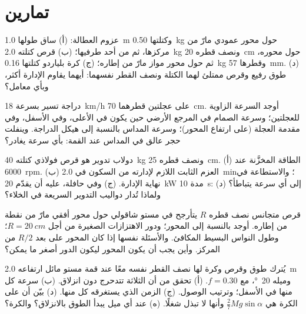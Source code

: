 \section{تمارين}

\begin{exercise}[$\star$]\label{exo:b2:rigid-body-mechanics:1}
عزوم العطالة: (أ) ساق طولها \qty{1.0}{m} وكتلتها \qty{0.50}{kg} حول
محور عمودي مارّ من مركزها، ثم من أحد طرفيها؛ (ب) قرص كتلته
\qty{2.0}{kg} ونصف قطره \qty{20}{cm} حول محوره، ثم حول محور مواز
مارّ من إطاره؛ (ج) كرة بلياردو كتلتها \qty{0.16}{kg} وقطرها
\qty{57}{mm}. (د) طوق رفيع وقرص ممتلئ لهما الكتلة ونصف القطر
نفسهما: أيهما يقاوم الإدارة أكثر، وبأي معامل؟
\end{exercise}

\begin{exercise}[$\star$]\label{exo:b2:rigid-body-mechanics:2}
دراجة تسير بسرعة \qty{18}{km/h} على عجلتين قطرهما \qty{70}{cm}.
أوجد السرعة الزاوية للعجلتين؛ وسرعة الصمام في المرجع الأرضي
حين يكون في الأعلى، وفي الأسفل، وفي مقدمة العجلة (على ارتفاع
المحور)؛ وسرعة المداس بالنسبة إلى هيكل الدراجة. وينفلت حجر عالق
في المداس عند القمة: بأي سرعة يغادر؟
\end{exercise}

\begin{exercise}[$\star$]\label{exo:b2:rigid-body-mechanics:3}
دولاب تدوير هو قرص فولاذي كتلته \qty{40}{kg} ونصف قطره \qty{25}{cm}.
(أ) الطاقة المخزَّنة عند \qty{6000}{rpm}. (ب) العزم الثابت اللازم
لإدارته من السكون في \qty{2.0}{min}؛ والاستطاعة في نهاية الإدارة.
(ج) وفي حافلة، عليه أن يقدّم \qty{20}{kW} مدة \qty{10}{s}: إلى أي
سرعة يتباطأ؟ (د) ولماذا تُدار دواليب التدوير السريعة في الخلاء؟
\end{exercise}

\begin{exercise}[$\star$]\label{exo:b2:rigid-body-mechanics:4}
قرص متجانس نصف قطره $R$ يتأرجح في مستو شاقولي حول محور أفقي
مارّ من نقطة من إطاره. أوجد  بالنسبة إلى المحور؛
ودور الاهتزازات الصغيرة من أجل $R = \qty{20}{cm}$؛ وطول النواس
البسيط المكافئ. والأسئلة نفسها إذا كان المحور على بعد $R/2$ من
المركز. وأين يجب أن يكون المحور ليكون الدور أصغر ما يمكن؟
\end{exercise}

\begin{exercise}[$\star\star$]\label{exo:b2:rigid-body-mechanics:5}
يُترك طوق وقرص وكرة لها نصف القطر نفسه معًا عند قمة مستو مائل
ارتفاعه \qty{2.0}{m} وميله \qty{20}{\degree}، مع $f =
0.30$. (أ) تحقق من أن الثلاثة تتدحرج دون انزلاق. (ب) سرعة كل منها
في الأسفل؛ وترتيب الوصول. (ج) الزمن الذي يستغرقه كل منها.
(د) بيّن أن  على الكرة هي $\tfrac27Mg\sin\alpha$ وأنها
لا تبذل شغلًا. (ه) عند أي ميل يبدأ الطوق بالانزلاق؟ والكرة؟
\end{exercise}

